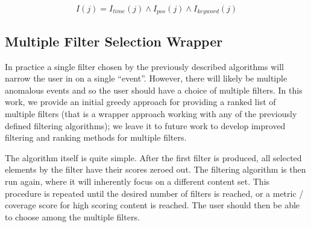 \begin{enumerate}

\begin{equation}
  I(j) = I_{\mathit{time}}(j) \land I_{\mathit{pos}}(j) \land I_{\mathit{keyword}}(j)
\end{equation}

\end{enumerate}

\subsection{Multiple Filter Selection Wrapper}

In practice a single filter chosen by the previously described algorithms will narrow the user in on a single \textquotedblleft event\textquotedblright{}. However, there will likely be multiple anomalous events and so the user should have a choice of multiple filters.  In this work, we provide an initial greedy approach for providing a ranked list of multiple filters (that is a wrapper approach working with any of the previously defined filtering algorithms); we leave it to future work to develop improved filtering and ranking methods for multiple filters.

The algorithm itself is quite simple.  After the first filter is produced, all selected elements by the filter have their scores zeroed out.  The filtering algorithm is then run again, where it will inherently focus on a different content set.  This procedure is repeated until the desired number of filters is reached, or a metric / coverage score for high scoring content is reached.  The user should then be able to choose among the multiple filters. 	










